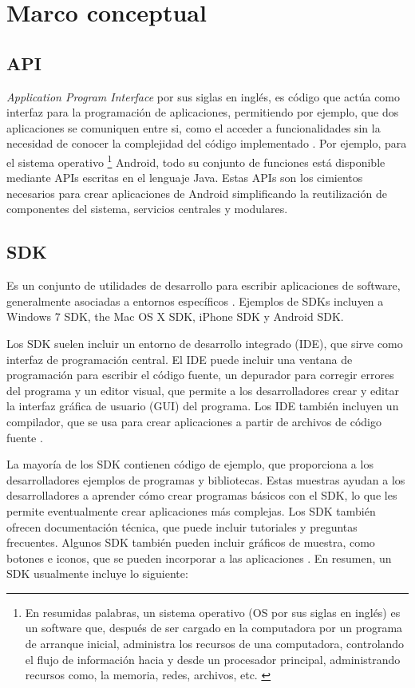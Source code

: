 \section{Marco conceptual}

\subsection{API}
\textit{Application Program Interface} por sus siglas en inglés, es código que actúa como interfaz para la programación de aplicaciones, permitiendo por ejemplo, que dos aplicaciones se comuniquen entre si, como el acceder a funcionalidades sin la necesidad de conocer la complejidad del código implementado \citep{techtarget-API}. Por ejemplo, para el sistema operativo \footnote{En resumidas palabras, un sistema operativo (OS por sus siglas en inglés) es un software que, después de ser cargado en la computadora por un programa de arranque inicial, administra los recursos de una computadora, controlando el flujo de información hacia y desde un procesador principal, administrando recursos como, la memoria, redes, archivos, etc. \citep{gartner-group-OS}} Android, todo su conjunto de funciones está disponible mediante APIs escritas en el lenguaje Java. Estas APIs son los cimientos necesarios para crear aplicaciones de Android simplificando la reutilización de componentes del sistema, servicios centrales y modulares.

\subsection{SDK}
Es un conjunto de utilidades de desarrollo para escribir aplicaciones de software, generalmente asociadas a entornos específicos \citep{gartner-group-SDK}. Ejemplos de SDKs incluyen a Windows 7 SDK, the Mac OS X SDK, iPhone SDK y Android SDK. 

Los SDK suelen incluir un entorno de desarrollo integrado (IDE), que sirve como interfaz de programación central. El IDE puede incluir una ventana de programación para escribir el código fuente, un depurador para corregir errores del programa y un editor visual, que permite a los desarrolladores crear y editar la interfaz gráfica de usuario (GUI) del programa. Los IDE también incluyen un compilador, que se usa para crear aplicaciones a partir de archivos de código fuente \citep{techterms-SDK}.

La mayoría de los SDK contienen código de ejemplo, que proporciona a los desarrolladores ejemplos de programas y bibliotecas. Estas muestras ayudan a los desarrolladores a aprender cómo crear programas básicos con el SDK, lo que les permite eventualmente crear aplicaciones más complejas. Los SDK también ofrecen documentación técnica, que puede incluir tutoriales y preguntas frecuentes. Algunos SDK también pueden incluir gráficos de muestra, como botones e iconos, que se pueden incorporar a las aplicaciones \citep{techterms-SDK}. En resumen, un SDK usualmente incluye lo siguiente:

